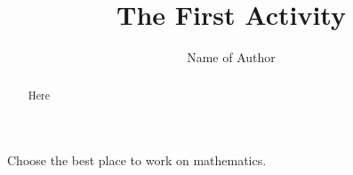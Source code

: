 \documentclass{ximera}
\title{The First Activity}
\author{Name of Author}
\begin{document}
\begin{abstract}
Here
\end{abstract}
\maketitle
\begin{exercise}
  Choose the best place to work on mathematics.
  \begin{multipleChoice}
  \end{multipleChoice}
\end{exercise}
\end{document}
